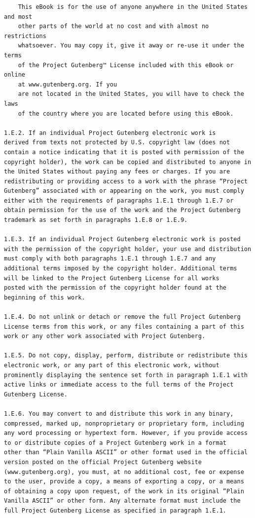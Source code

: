 \documentclass{article}
\begin{document}
\begin{verbatim}
    This eBook is for the use of anyone anywhere in the United States and most
    other parts of the world at no cost and with almost no restrictions
    whatsoever. You may copy it, give it away or re-use it under the terms
    of the Project Gutenberg™ License included with this eBook or online
    at www.gutenberg.org. If you
    are not located in the United States, you will have to check the laws
    of the country where you are located before using this eBook.

1.E.2. If an individual Project Gutenberg electronic work is
derived from texts not protected by U.S. copyright law (does not
contain a notice indicating that it is posted with permission of the
copyright holder), the work can be copied and distributed to anyone in
the United States without paying any fees or charges. If you are
redistributing or providing access to a work with the phrase “Project
Gutenberg” associated with or appearing on the work, you must comply
either with the requirements of paragraphs 1.E.1 through 1.E.7 or
obtain permission for the use of the work and the Project Gutenberg
trademark as set forth in paragraphs 1.E.8 or 1.E.9.

1.E.3. If an individual Project Gutenberg electronic work is posted
with the permission of the copyright holder, your use and distribution
must comply with both paragraphs 1.E.1 through 1.E.7 and any
additional terms imposed by the copyright holder. Additional terms
will be linked to the Project Gutenberg License for all works
posted with the permission of the copyright holder found at the
beginning of this work.

1.E.4. Do not unlink or detach or remove the full Project Gutenberg
License terms from this work, or any files containing a part of this
work or any other work associated with Project Gutenberg.

1.E.5. Do not copy, display, perform, distribute or redistribute this
electronic work, or any part of this electronic work, without
prominently displaying the sentence set forth in paragraph 1.E.1 with
active links or immediate access to the full terms of the Project
Gutenberg License.

1.E.6. You may convert to and distribute this work in any binary,
compressed, marked up, nonproprietary or proprietary form, including
any word processing or hypertext form. However, if you provide access
to or distribute copies of a Project Gutenberg work in a format
other than “Plain Vanilla ASCII” or other format used in the official
version posted on the official Project Gutenberg website
(www.gutenberg.org), you must, at no additional cost, fee or expense
to the user, provide a copy, a means of exporting a copy, or a means
of obtaining a copy upon request, of the work in its original “Plain
Vanilla ASCII” or other form. Any alternate format must include the
full Project Gutenberg License as specified in paragraph 1.E.1.


\end{verbatim}
\end{document}
